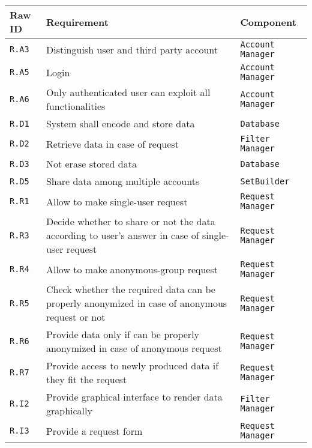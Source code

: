 \documentclass[../DD0.tex]{subfiles}
\begin{document}
    \begin{table}[h!]

      \centering
      \begin{tabularx}{.8\linewidth}{|X|X|X|}
        \hline
        \textbf{Raw ID} & \textbf{Requirement} & \textbf{Component} \\ \hline
        \texttt{R.A3} & Distinguish user and third party account & \texttt{Account Manager} \\
        \hline
        \texttt{R.A5} & Login & \texttt{Account Manager} \\
        \hline
        \texttt{R.A6} & Only authenticated user can exploit all functionalities & \texttt{Account Manager} \\
        \hline
        \texttt{R.D1}  & System shall encode and store data & \texttt{Database} \\
        \hline
        \texttt{R.D2}  &  Retrieve data in case of request & \texttt{Filter Manager} \\
        \hline
        \texttt{R.D3}  &  Not erase stored data & \texttt{Database} \\
        \hline
        \texttt{R.D5}  & Share data among multiple accounts & \texttt{SetBuilder} \\
        \hline
        \texttt{R.R1}  & Allow to make single-user request & \texttt{Request Manager} \\
        \hline
        \texttt{R.R3}  & Decide whether to share or not the data according to user's answer in case of single-user request & \texttt{Request Manager} \\
        \hline
        \texttt{R.R4}  & Allow to make anonymous-group request & \texttt{Request Manager} \\
        \hline
        \texttt{R.R5}  & Check whether the required data can be properly anonymized in case of anonymous request or not & \texttt{Request Manager} \\
        \hline
        \texttt{R.R6} & Provide data only if can be properly anonymized in case of anonymous request & \texttt{Request Manager}\\
        \hline 
        \texttt{R.R7} & Provide access to newly produced data if they fit the request & \texttt{Request Manager} \\
        \hline
        \texttt{R.I2} & Provide graphical interface to render data graphically & \texttt{Filter Manager} \\
        \hline
        \texttt{R.I3} & Provide a request form &\texttt{Request Manager} \\
        \hline
      \end{tabularx}
      \label{tab:automatedtp}
    \end{table}
\end{document}
